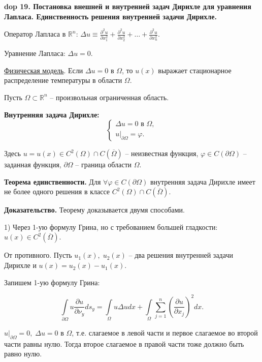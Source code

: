 \textbf{\LARGE dop 19. Постановка внешней и внутренней задач Дирихле для уравнения Лапласа. Единственность решения внутренней задачи Дирихле.}

Оператор Лапласа в $\mathbb{R}^n$: $\Delta u \equiv \frac{\partial^2 u}{\partial x_1^2} + \frac{\partial^2 u}{\partial x_2^2} + \ldots + \frac{\partial^2 u}{\partial x_n^2}$.

Уравнение Лапласа: $\Delta u = 0$.

\underline{Физическая модель}. Если $\Delta u = 0$ в $\Omega$, то $u(x)$ выражает стационарное распределение
температуры в области $\Omega$.

Пусть $\Omega \subset \mathbb{R}^n$ -- произвольная ограниченная область.

\textbf{Внутренняя задача Дирихле:}
\begin{equation*}
    \begin{cases}
    \Delta u = 0 \text{ в } \Omega, \\
    u |_{\partial \Omega} = \varphi.
    \end{cases}
\end{equation*}

Здесь $u = u(x) \in C^2(\Omega) \cap C(\overline{\Omega})$ -- неизвестная функция, $\varphi \in C(\partial \Omega)$ -- заданная функция, $\partial \Omega$ -- граница области $\Omega$.

\newline\newline
\textbf{Теорема единственности.} Для 
$\forall \varphi \in C(\partial \Omega)$ внутренняя задача Дирихле имеет не более одного решения в классе $C^2(\Omega) \cap C(\overline{\Omega})$.

\textbf{Доказательство.} Теорему доказывается двумя способами.

1) Через 1-ую формулу Грина, но с требованием большей гладкости: $u(x) \in C^2(\overline{\Omega})$. 

От противного. Пусть $u_1(x), \; u_2(x)$ -- два решения внутренней задачи Дирихле и $u(x) = u_2(x) - u_1(x)$.

Запишем 1-ую формулу Грина:

$$\int\limits_{\partial \Omega} u \frac{\partial u}{\partial \nu_y} ds_y = \int\limits_\Omega u \Delta u dx + \int\limits_\Omega \sum_{j=1}^n \left (\frac{\partial u}{\partial x_j} \right )^2 dx.$$

$u|_{\partial \Omega} = 0, \; \Delta u = 0$ в $\Omega$, т.е. слагаемое в левой части и первое слагаемое во второй части равны нулю. Тогда второе слагаемое в правой части тоже должно быть равно нулю.

